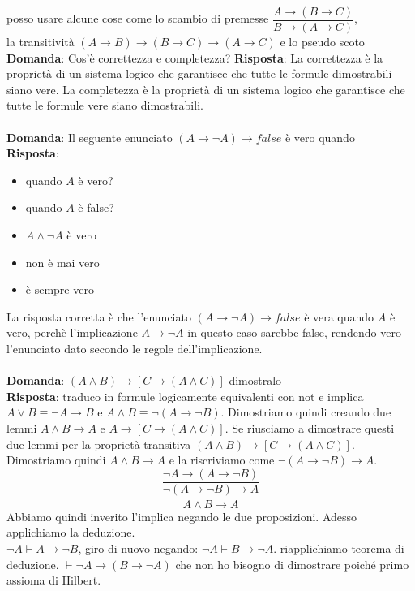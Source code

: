 \documentclass{article}
\begin{document}
posso usare alcune cose come lo scambio di premesse $\dfrac{A \to (B \to C)}{B \to (A \to C)}$, \\ la transitività $(A \to B) \to (B \to C) \to (A \to C)$ e lo pseudo scoto
\textbf{Domanda}: Cos'è correttezza e completezza?
\textbf{Risposta}: La correttezza è la proprietà di un sistema logico che garantisce che tutte le formule dimostrabili siano vere. La completezza è la proprietà di un sistema logico che garantisce che tutte le formule vere siano dimostrabili. \\ \\
\textbf{Domanda}: Il seguente enunciato $(A \to \lnot A) \to false$ è vero quando\\
\textbf{Risposta}: 
\begin{itemize}
    \item quando $A$ è vero?
    \item quando $A$ è false?
    \item $A \land \lnot A$ è vero
    \item non è mai vero
    \item è sempre vero
\end{itemize}
La risposta corretta è che l'enunciato $(A \to \lnot A) \to false$ è vera quando $A$ è vero, perchè l'implicazione $A \to \lnot A$ in questo caso sarebbe false, rendendo vero l'enunciato dato secondo le regole dell'implicazione. \\ \\
\textbf{Domanda}: $(A \land B) \to [C \to (A \land C)]$ dimostralo \\ 
\textbf{Risposta}: traduco in formule logicamente equivalenti con not e implica $A \lor B \equiv \lnot A \to B$ e $A \land B \equiv \lnot (A \to \lnot B)$.
Dimostriamo quindi creando due lemmi $A \land B \to A$ e $A \to [C \to (A \land C)]$.
Se riusciamo a dimostrare questi due lemmi per la proprietà transitiva $(A \land B) \to [C \to (A \land C)]$.
Dimostriamo quindi $A \land B \to A$ e la riscriviamo come $\lnot(A \to \lnot B) \to A$.
\begin{equation}
    \dfrac{ \dfrac{\lnot A \to (A \to \lnot B)}{\lnot (A \to \lnot B) \to A }}{A \land B \to A}
\end{equation}
Abbiamo quindi inverito l'implica negando le due proposizioni. Adesso applichiamo la deduzione. \\
$\lnot A \vdash A \to \lnot B$, giro di nuovo negando: $\lnot A \vdash B \to \lnot A$. riapplichiamo teorema di deduzione. $\vdash \lnot A \to (B \to \lnot A)$ che non ho bisogno di dimostrare poiché primo assioma di Hilbert.
\end{document}
